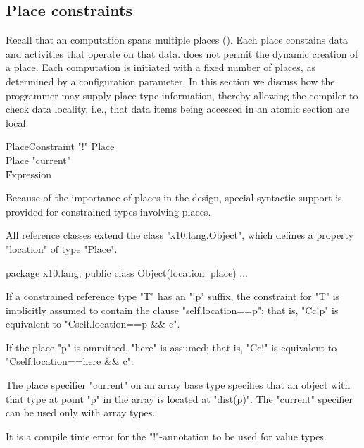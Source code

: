 \subsection{Place constraints}\label{PlaceTypes}
\label{DepType:PlaceType}

Recall that an \Xten{} computation spans multiple places
(). Each place constains data and activities that
operate on that data.  \XtenCurrVer{} does not permit the dynamic
creation of a place. Each \Xten{} computation is initiated with a
fixed number of places, as determined by a configuration parameter.
In this section we discuss how the programmer may supply place type
information, thereby allowing the compiler to check data locality,
i.e., that data items being accessed in an atomic section are local.

\begin{grammar}
PlaceConstraint     \: \xcd"!" Place\opt \\
Place              \:  \xcd"current" \\
                        \| Expression \\
\end{grammar}

Because of the importance of places in the \Xten{} design, special
syntactic support is provided for constrained types involving places.

All \Xten{} reference classes extend the class
\xcd"x10.lang.Object", which defines a property
\xcd"location" of type
\xcd"Place".

\begin{xten}
package x10.lang;
public class Object(location: place) { ... }  
\end{xten}

If a constrained reference type \xcd"T" has an \xcd"!p" suffix,
the constraint for \xcd"T" is implicitly assumed to contain the clause
\xcd"self.location==p"; that is,
\xcd"C{c}!p" is equivalent to \xcd"C{self.location==p && c}".

If the place \xcd"p" is ommitted, \xcd"here" is assumed; that is,
\xcd"C{c}!" is equivalent to \xcd"C{self.location==here && c}".


The place specifier \xcd"current" on an array base type
specifies that an object with that type at point \xcd"p"
in the array 
is located at \xcd"dist(p)".  The \xcd"current" specifier can be
used only with array types.

\begin{staticrule*}
  It is a compile time error for the \xcd"!"-annotation to
  be used for value types.
\end{staticrule*}

